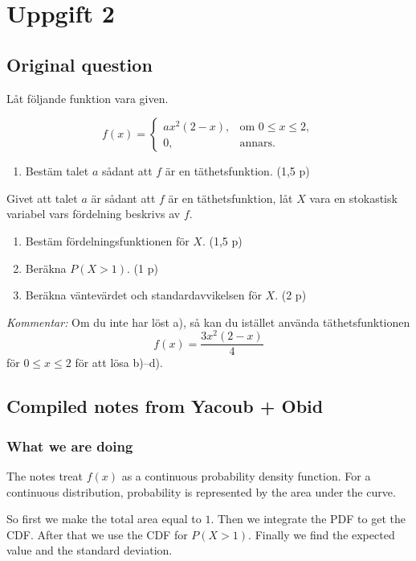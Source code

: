 \documentclass[10pt]{article}
\begin{document}
\section*{Uppgift 2}

\subsection*{Original question}
Låt följande funktion vara given.

\[
f(x)=
\begin{cases}
ax^2(2-x),
& \text{om } 0\leq x\leq 2,\\
0,
& \text{annars.}
\end{cases}
\]

\begin{enumerate}[label=\alph*)]
\item Bestäm talet $a$ sådant att $f$ är en täthetsfunktion.
\hfill (1,5 p)
\end{enumerate}

Givet att talet $a$ är sådant att $f$ är en täthetsfunktion,
låt $X$ vara en stokastisk variabel vars fördelning beskrivs av $f$.

\begin{enumerate}[label=\alph*),resume]
\item Bestäm fördelningsfunktionen för $X$.
\hfill (1,5 p)
\item Beräkna $P(X>1)$.
\hfill (1 p)
\item Beräkna väntevärdet och standardavvikelsen för $X$.
\hfill (2 p)
\end{enumerate}

\textit{Kommentar:}
Om du inte har löst a), så kan du istället använda
täthetsfunktionen
\[
f(x)=\frac{3x^2(2-x)}{4}
\]
för $0\leq x\leq 2$ för att lösa b)--d).

\subsection*{Compiled notes from Yacoub + Obid}

\subsubsection*{What we are doing}
The notes treat $f(x)$ as a continuous probability
density function.
For a continuous distribution, probability is represented
by the area under the curve.

So first we make the total area equal to $1$.
Then we integrate the PDF to get the CDF.
After that we use the CDF for $P(X>1)$.
Finally we find the expected value and the standard deviation.
\end{document}
